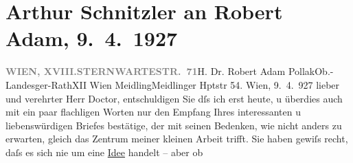 

         
         \renewcommand{\erwaehntePersonen}{Personen: Robert Adam}
         \renewcommand{\erwaehnteOrte}{Orte: Meidlinger Hauptstraße, Sternwartestraße, Wien, XII., Meidling, XVIII., Währing}
         \renewcommand{\erwaehnteWerke}{Werke: Der Geist im Wort und der Geist in der Tat}
               \section[Arthur Schnitzler an Robert Adam, 9. 4. 1927]{ Arthur Schnitzler an Robert Adam, 9. 4. 1927}\nopagebreak{}\rehead{ }\begin{ledgroupsized}[t]{13cm}\normalsize\beginnumbering \toendnotes[C]{\smallbreak\pagebreak[2]} 
\toendnotes[C]{\smallbreak}\pstart{}{\pb}\label{T_L02484-1v}\label{T_L02484-1h}\pend{}\pstart{}\textcolor{gray}{\textbf{WIEN, XVIII.}}\pend{}\pstart{}\textcolor{gray}{\textbf{STERNWARTESTR. 71}}\pend{}{\bigskip}\pstart{}H. Dr. Robert Adam Pollak\pend{}\pstart{}Ob.-Landesger-Rath\pend{}\pstart{}XII Wien Meidling\pend{}\pstart{}Meidlinger Hptstr 54.\pend{}{\bigskip}\pstart
           \raggedleft{}{\pb}Wien, 9. 4. 927\pend
           \pstart
           lieber und verehrter Herr Doctor, entschuldigen Sie dſs ich
                    erst heute, u überdies auch mit ein paar flachligen Worten nur den Empfang Ihres
                    interessanten u liebenswürdigen Briefes bestätige, der mit seinen Bedenken, wie
                    nicht anders zu erwarten, gleich das Zentrum meiner kleinen Arbeit trifft. Sie haben gewiſs recht,
                    daſs es sich nie um eine \uline{Idee} handelt – aber ob

\end{ledgroupsized}
